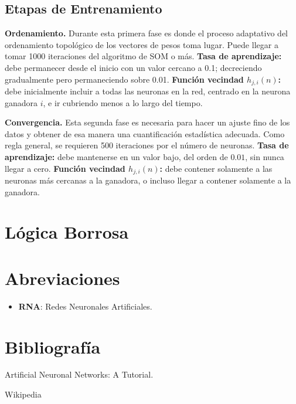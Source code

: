 \documentclass[10pt,a4paper]{article}
\begin{document}
\subsection{Etapas de Entrenamiento}
\begin{description}
\item \textbf{Ordenamiento.} Durante esta primera fase es donde el proceso adaptativo  del ordenamiento topológico de los vectores de pesos toma lugar. Puede llegar a tomar 1000 iteraciones del algoritmo de SOM o más.
\subitem \textbf{Tasa de aprendizaje:} debe permanecer desde el inicio con un valor cercano a 0.1; decreciendo gradualmente pero permaneciendo sobre 0.01.
\subitem \textbf{Función vecindad $h_{j,i} (n)$:} debe inicialmente incluir a todas las neuronas en la red, centrado en la neurona ganadora $i$, e ir cubriendo menos a lo largo del tiempo.
\item \textbf{Convergencia.} Esta segunda fase es necesaria para hacer un ajuste fino de los datos y obtener de esa manera una cuantificación estadística adecuada. Como regla general, se requieren 500 iteraciones por el número de neuronas.
\subitem \textbf{Tasa de aprendizaje:} debe mantenerse en un valor bajo, del orden de $0.01$, sin nunca llegar a cero.
\subitem \textbf{Función vecindad $h_{j,i} (n)$:} debe contener solamente a las neuronas más cercanas a la ganadora, o incluso llegar a contener solamente a la ganadora.
\end{description}

\section{Lógica Borrosa}

\pagebreak

\section{Abreviaciones}
\begin{itemize}
\item \textbf{RNA}: Redes Neuronales Artificiales.
\end{itemize}

\section{Bibliografía}
\begin{description}
\item Artificial Neuronal Networks: A Tutorial.
\item Wikipedia
\end{description}
\end{document}
